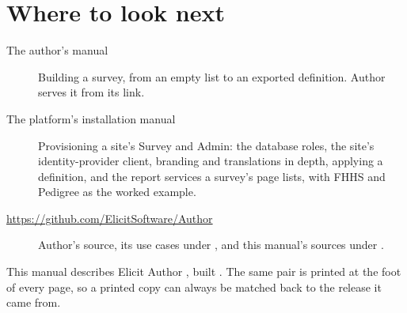 \documentclass[11pt, a4paper]{article}
\begin{document}
\section{Where to look next}
\label{sec:next}

\begin{description}
  \item[The author's manual] Building a survey, from an empty list to an exported definition.
        Author serves it from its  link.
  \item[The platform's installation manual] Provisioning a site's Survey and Admin: the
        database roles, the site's identity-provider client, branding and translations in
        depth, applying a definition, and the report services a survey's 
        page lists, with FHHS and Pedigree as the worked example.
  \item[\url{https://github.com/ElicitSoftware/Author}] Author's source, its use cases under
        , and this manual's sources under .
\end{description}

\vspace{1em}

\begin{elicitnote}
This manual describes Elicit Author \textbf{\elicitVersion}, built
\textbf{\elicitBuildDate}. The same pair is printed at the foot of every page, so a printed
copy can always be matched back to the release it came from.
\end{elicitnote}
\end{document}
